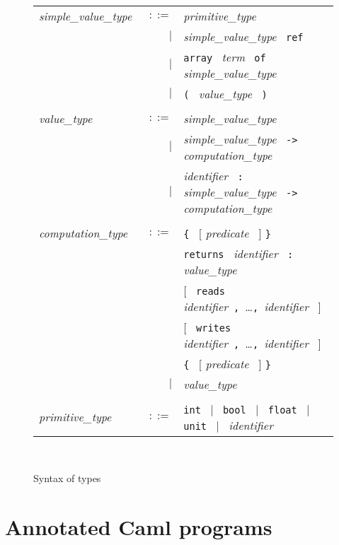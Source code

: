 \documentclass[a4paper,12pt]{report}
\newcommand{\te}[1]{\texttt{#1}~}
\newcommand{\nt}[1]{\textsl{#1}~}
\begin{document}
\begin{figure}[htbp]
\begin{center}
\hrulefill\\
\begin{tabular}{lrl}
  \nt{simple\_value\_type}
    & $::=$ & \nt{primitive\_type} \\
      & $|$ & \nt{simple\_value\_type} \te{ref} \\
      & $|$ & \te{array} \nt{term} \te{of} \nt{simple\_value\_type} \\
      & $|$ & \te{(} \nt{value\_type} \te{)} \\
  \\[0.1em]

  \nt{value\_type}
    & $::=$ & \nt{simple\_value\_type} \\
      & $|$ & \nt{simple\_value\_type} \te{->} \nt{computation\_type} \\
      & $|$ & \nt{identifier} \te{:} \nt{simple\_value\_type} 
              \te{->} \nt{computation\_type} \\
  \\[0.1em]

  \nt{computation\_type}
    & $::=$ & \te{\{} $[$ \nt{predicate} $]$ \te{\}} \\
      &     & \te{returns} \nt{identifier} \te{:} \nt{value\_type} \\
      &     & $[$~ \te{reads} 
                   \nt{identifier}\te{,}\ldots\te{,}\nt{identifier} $]$~ \\
      &     & $[$~ \te{writes} 
                   \nt{identifier}\te{,}\ldots\te{,}\nt{identifier} $]$~ \\
      &     & \te{\{} $[$ \nt{predicate} $]$ \te{\}} \\
      & $|$ & \nt{value\_type} \\
  \\[0.1em]

  \nt{primitive\_type}
    & $::=$ & \te{int} $|$~ \te{bool} $|$~ \te{float} $|$~ 
              \te{unit} $|$~ \nt{identifier}
\end{tabular}\\
\hrulefill
\caption{Syntax of types}
\label{fig:types}
\end{center}            
\end{figure}

\section{Annotated Caml programs}
\end{document}
